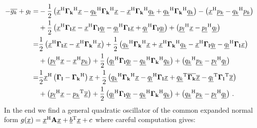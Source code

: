 \documentclass[a4paper,10pt]{article}
\begin{document}
\begin{equation*}
\begin{split}
 -\conj{g_k} + g_l
 = &
 -\frac{1}{2} \left(
               \vec{x}\H \mat{\Gamma_k}\H \vec{x}
              -\vec{q_k}\H \mat{\Gamma_k}\H \vec{x}
              -\vec{x}\H \mat{\Gamma_k}\H \vec{q_k}
              +\vec{q_k}\H \mat{\Gamma_k}\H \vec{q_k}
              \right)
 - \left(\vec{x}\H \vec{p_k} - \vec{q_k}\H \vec{p_k}\right) \\
 & +
  \frac{1}{2} \left(
                \vec{x}\H \mat{\Gamma_l} \vec{x}
               -\vec{x}\H \mat{\Gamma_l} \vec{q_l}
               -\vec{q_l}\H \mat{\Gamma_l} \vec{x}
               +\vec{q_l}\H \mat{\Gamma_l} \vec{q_l}
              \right)
 + \left(\vec{p_l}\H \vec{x} - \vec{p_l}\H \vec{q_l}\right) \\
 = &
 \frac{1}{2} \left(\vec{x}\H \mat{\Gamma_l} \vec{x} - \vec{x}\H \mat{\Gamma_k}\H \vec{x}\right)
 +
 \frac{1}{2} \left(
               \vec{q_k}\H \mat{\Gamma_k}\H \vec{x}
              +\vec{x}\H \mat{\Gamma_k}\H \vec{q_k}
              -\vec{x}\H \mat{\Gamma_l} \vec{q_l}
              -\vec{q_l}\H \mat{\Gamma_l} \vec{x}
             \right) \\
 & +
 \left(\vec{p_l}\H \vec{x} - \vec{x}\H \vec{p_k}\right)
 + \frac{1}{2} \left(
                 \vec{q_l}\H \mat{\Gamma_l} \vec{q_l}
                -\vec{q_k}\H \mat{\Gamma_k}\H \vec{q_k}
               \right)
 + \left(\vec{q_k}\H \vec{p_k} - \vec{p_l}\H \vec{q_l}\right) \\
 = &
 \frac{1}{2} \vec{x}\H \left(\mat{\Gamma_l} - \mat{\Gamma_k}\H\right) \vec{x}
 + \frac{1}{2} \left(
                 \vec{q_k}\H \mat{\Gamma_k}\H \vec{x}
                -\vec{q_l}\H \mat{\Gamma_l} \vec{x}
                +\vec{q_k}\T \conj{\mat{\Gamma_k}} \conj{\vec{x}}
                -\vec{q_l}\T \mat{\Gamma_l}\T \conj{\vec{x}}
               \right) \\
 & +
 \left(\vec{p_l}\H \vec{x} - \vec{p_k}\T \conj{\vec{x}}\right)
 + \frac{1}{2} \left(
                 \vec{q_l}\H \mat{\Gamma_l} \vec{q_l}
                -\vec{q_k}\H \mat{\Gamma_k}\H \vec{q_k}
               \right)
 + \left(\vec{q_k}\H \vec{p_k} - \vec{p_l}\H \vec{q_l}\right) \,.
\end{split}
\end{equation*}
In the end we find a general quadratic oscillator of the common expanded
normal form
$g(\vec{x}) = \vec{x}\H \mat{A} \vec{x} + \vec{b}\T \vec{x} + c$
where careful computation gives:
\end{document}
